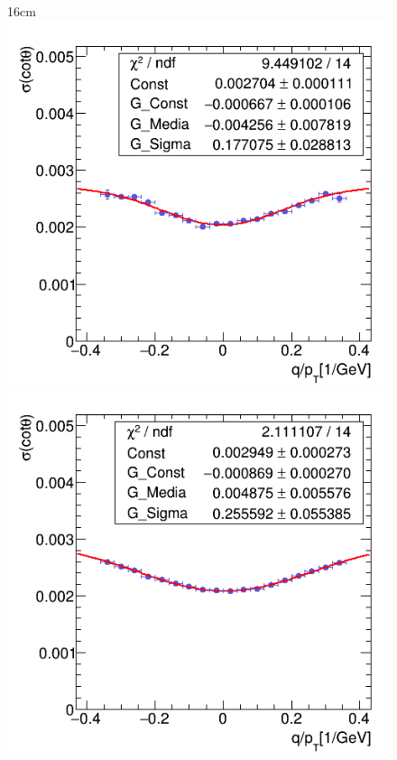 \begin{figure}[htbp]{16cm}
\includegraphics[scale=0.28]{AppendixCMSL1TT/figs/r_cotTheta_fit_single_muon_nopu}
\includegraphics[scale=0.28]{AppendixCMSL1TT/figs/r_cotTheta_fit_single_electron_nopu}
\label{fig:resolutions}	
\end{figure}

